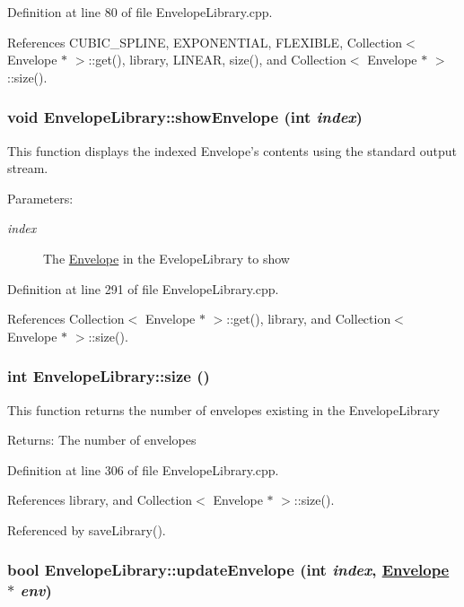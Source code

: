 Definition at line 80 of file Envelope\-Library.cpp.

References CUBIC\_\-SPLINE, EXPONENTIAL, FLEXIBLE, Collection$<$ Envelope $\ast$ $>$::get(), library, LINEAR, size(), and Collection$<$ Envelope $\ast$ $>$::size().\hypertarget{classEnvelopeLibrary_a10}{
\subsubsection[showEnvelope]{\setlength{\rightskip}{0pt plus 5cm}void Envelope\-Library::show\-Envelope (int {\em index})}}
\label{classEnvelopeLibrary_a10}


This function displays the indexed Envelope's contents using the standard output stream. \begin{Desc}
\item[Parameters:]
\begin{description}
\item[{\em index}]The \hyperlink{classEnvelope}{Envelope} in the Evelope\-Library to show \end{description}
\end{Desc}


Definition at line 291 of file Envelope\-Library.cpp.

References Collection$<$ Envelope $\ast$ $>$::get(), library, and Collection$<$ Envelope $\ast$ $>$::size().\hypertarget{classEnvelopeLibrary_a11}{
\subsubsection[size]{\setlength{\rightskip}{0pt plus 5cm}int Envelope\-Library::size ()}}
\label{classEnvelopeLibrary_a11}


This function returns the number of envelopes existing in the Envelope\-Library \begin{Desc}
\item[Returns:]The number of envelopes \end{Desc}


Definition at line 306 of file Envelope\-Library.cpp.

References library, and Collection$<$ Envelope $\ast$ $>$::size().

Referenced by save\-Library().\hypertarget{classEnvelopeLibrary_a9}{
\subsubsection[updateEnvelope]{\setlength{\rightskip}{0pt plus 5cm}bool Envelope\-Library::update\-Envelope (int {\em index}, \hyperlink{classEnvelope}{Envelope} $\ast$ {\em env})}}
\label{classEnvelopeLibrary_a9}


